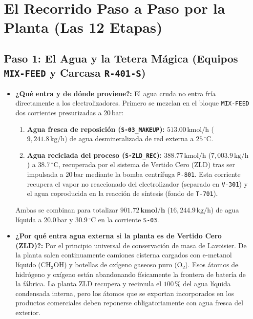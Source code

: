\documentclass[11pt,a4paper]{article}
\begin{document}
\section{El Recorrido Paso a Paso por la Planta (Las 12 Etapas)}

\subsection{Paso 1: El Agua y la Tetera Mágica (Equipos \texttt{MIX-FEED} y Carcasa \texttt{R-401-S})}
\begin{itemize}
    \item \textbf{¿Qué entra y de dónde proviene?:} El agua cruda no entra fría directamente a los electrolizadores. Primero se mezclan en el bloque \texttt{MIX-FEED} dos corrientes presurizadas a $20\,\text{bar}$:
    \begin{enumerate}
        \item \textbf{Agua fresca de reposición (\texttt{S-03\_MAKEUP}):} $513.00\,\text{kmol/h}$ ($9{,}241.8\,\text{kg/h}$) de agua desmineralizada de red externa a $25\,^\circ\text{C}$.
        \item \textbf{Agua reciclada del proceso (\texttt{S-ZLD\_REC}):} $388.77\,\text{kmol/h}$ ($7{,}003.9\,\text{kg/h}$) a $38.7\,^\circ\text{C}$, recuperada por el sistema de Vertido Cero (ZLD) tras ser impulsada a $20\,\text{bar}$ mediante la bomba centrífuga \texttt{P-801}. Esta corriente recupera el vapor no reaccionado del electrolizador (separado en \texttt{V-301}) y el agua coproducida en la reacción de síntesis (fondo de \texttt{T-701}).
    \end{enumerate}
    Ambas se combinan para totalizar $\mathbf{901.72\,\text{kmol/h}}$ ($16{,}244.9\,\text{kg/h}$) de agua líquida a $20.0\,\text{bar}$ y $30.9\,^\circ\text{C}$ en la corriente \texttt{S-03}.
    
    \item \textbf{¿Por qué entra agua externa si la planta es de Vertido Cero (ZLD)?:} Por el principio universal de conservación de masa de Lavoisier. De la planta salen continuamente camiones cisterna cargados con e-metanol líquido ($\text{CH}_3\text{OH}$) y botellas de oxígeno gaseoso puro ($\text{O}_2$). Esos átomos de hidrógeno y oxígeno están abandonando físicamente la frontera de batería de la fábrica. La planta ZLD recupera y recircula el $100\,\%$ del agua líquida condensada interna, pero los átomos que se exportan incorporados en los productos comerciales deben reponerse obligatoriamente con agua fresca del exterior.


\end{itemize}
\end{document}
